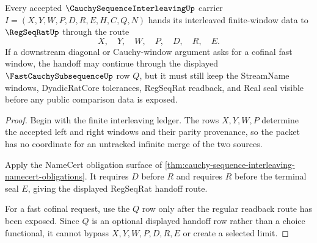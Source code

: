 \begin{theorem}
\label{thm:cauchy-sequence-interleaving-regseqrat-handoff}
Every accepted $\CauchySequenceInterleavingUp$ carrier $I=(X,Y,W,P,D,R,E,H,C,Q,N)$ hands its interleaved finite-window data to $\RegSeqRatUp$ through the route
$$
X,\quad Y,\quad W,\quad P,\quad D,\quad R,\quad E .
$$
If a downstream diagonal or Cauchy-window argument asks for a cofinal fast window, the handoff may continue through the displayed $\FastCauchySubsequenceUp$ row $Q$, but it must still keep the StreamName windows, DyadicRatCore tolerances, RegSeqRat readback, and Real seal visible before any public comparison data is exposed.
\end{theorem}
\begin{proof}
Begin with the finite interleaving ledger. The rows $X,Y,W,P$ determine the accepted left and right windows and their parity provenance, so the packet has no coordinate for an untracked infinite merge of the two sources.

Apply the NameCert obligation surface of \autoref{thm:cauchy-sequence-interleaving-namecert-obligations}. It requires $D$ before $R$ and requires $R$ before the terminal seal $E$, giving the displayed RegSeqRat handoff route.

For a fast cofinal request, use the $Q$ row only after the regular readback route has been exposed. Since $Q$ is an optional displayed handoff row rather than a choice functional, it cannot bypass $X,Y,W,P,D,R,E$ or create a selected limit.
\end{proof}

\begin{closurestatus}{\CauchySequenceInterleavingUp}
  \theoryclosure{\seedClosure}
  \formalstatus{\unformalizedV}
\end{closurestatus}
